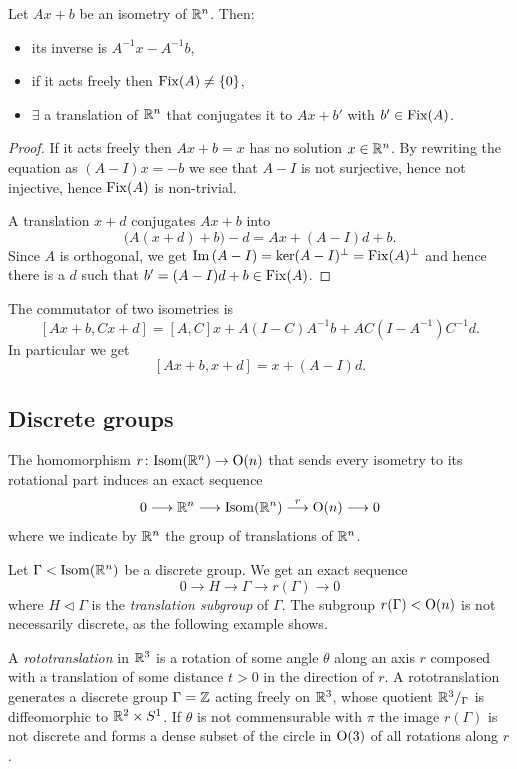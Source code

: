 \begin{prop} \label{basic:isometries:Rn:prop}
Let $Ax+b$ be an isometry of $\mathbb{R}^n$. Then:
\begin{itemize}
\item its inverse is $A^{-1}x-A^{-1}b$,
\item if it acts freely then ${\rm Fix}(A)\neq \{0\}$,
\item $\exists$ a translation of $\mathbb{R}^n$ that conjugates it to $Ax+b'$ with $b'\in {\rm Fix}(A)$.
\end{itemize}
\end{prop}
\begin{proof}
If it acts freely then $Ax+b=x$ has no solution $x\in\mathbb{R}^n$. By rewriting the equation as $(A-I)x = -b$ we see that $A-I$ is not surjective, hence not injective, hence ${\rm Fix}(A)$ is non-trivial.

A translation $x+d$ conjugates $Ax+b$ into 
$$\big(A(x+d)+b\big)-d = Ax + (A-I)d + b.$$
Since $A$ is orthogonal, we get ${\rm Im\,} (A-I) = \ker (A-I)^\perp = {\rm Fix}(A)^\perp$ and hence there is a $d$ such that $b'=(A-I)d+b\in {\rm Fix}(A)$.
\end{proof}

\begin{ex} \label{Euclidean:commutators:ex}
The commutator of two isometries is
$$[Ax+b, Cx+d] = [A,C]x + A(I-C)A^{-1}b + AC(I-A^{-1})C^{-1}d.$$
In particular we get
$$[Ax+b,x+d] = x + (A-I)d.$$
\end{ex}

\subsection{Discrete groups}
The homomorphism $r\colon {\rm Isom}(\mathbb{R}^n)\to {\rm O}(n)$ that sends every isometry to its rotational part induces an exact sequence
$$0 \longrightarrow \mathbb{R}^n \longrightarrow {\rm Isom}(\mathbb{R}^n) \stackrel{r}\longrightarrow {\rm O}(n) \longrightarrow 0$$
where we indicate by $\mathbb{R}^n$ the group of translations of $\mathbb{R}^n$. 

Let $\Gamma < {\rm Isom}(\mathbb{R}^n)$ be a discrete group. We get an exact sequence
$$0 \longrightarrow H \longrightarrow \Gamma \longrightarrow r(\Gamma) \longrightarrow 0$$
where $H \triangleleft \Gamma$ is the \emph{translation subgroup} of $\Gamma$. The subgroup $r(\Gamma)<{\rm O}(n)$ is not necessarily discrete, as the following example shows.

\begin{example} \label{rototranslation:example}
A \emph{rototranslation} in $\mathbb{R}^3$ is a rotation of some angle $\theta$ along an axis $r$ composed with a translation of some distance $t>0$ in the direction of $r$. A rototranslation generates a discrete group $\Gamma = \mathbb{Z}$ acting freely on $\mathbb{R}^3$, whose quotient $\mathbb{R}^3/_\Gamma$ is diffeomorphic to $\mathbb{R}^2\times S^1$. If $\theta$ is not commensurable with $\pi$ the image $r(\Gamma)$ is not discrete and forms a dense subset of the circle in ${\rm O}(3)$ of all rotations along $r$.
\end{example}

